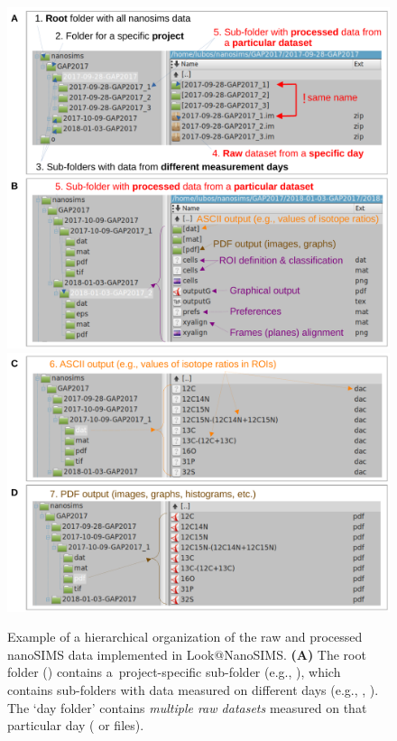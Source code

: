 \begin{figure}[!hb]
\centering
\includegraphics[scale=0.41]{figs2/folders_organizationAB}\\
\includegraphics[scale=0.41]{figs2/folders_organizationCD}
\caption{\label{fig2:data_organization}%
	Example of a hierarchical organization of the raw and processed nanoSIMS data implemented in Look@NanoSIMS. %
  \textbf{(A)} The root folder () contains a~project-specific sub-folder (e.g., ), which contains sub-folders with data measured on different days (e.g., , ). %
  The `day folder' contains \emph{multiple raw datasets} measured on that particular day ( or  files). %
}
\end{figure}
